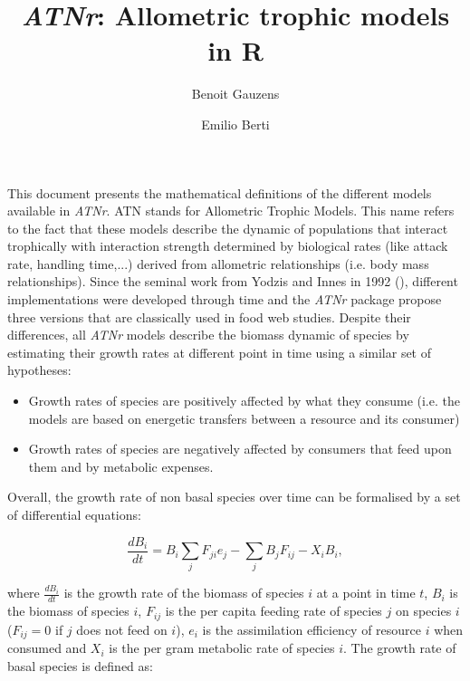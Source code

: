 \documentclass[12pt,a4paper]{article}
\title{\textit{ATNr}: Allometric trophic models in R}
\author[1,2]{Benoit Gauzens}
\author[1,2]{Emilio Berti}
\affil[1]{EcoNetLab, German Centre for Integrative Biodiversity Research (iDiv) Halle-Jena-Leipzig 04103 Germany}
\affil[2]{Institute of Biodiversity, Friedrich Schiller University Jena 07743 Germany}
\begin{document}
\maketitle

This document presents the mathematical definitions of the different models available in \textit{ATNr}. ATN stands for Allometric Trophic Models. 
This name refers to the fact that these models describe the dynamic of populations that interact trophically with interaction strength determined by biological rates (like attack rate, handling time,...) derived from allometric relationships (i.e. body mass relationships).
Since the seminal work from Yodzis and Innes in 1992 (\cite{Yodzis&Innes}), different implementations were developed through time and the \textit{ATNr} package propose three versions that are classically used in food web studies. Despite their differences, all \textit{ATNr} models describe the biomass dynamic of species by estimating their growth rates at different point in time using a similar set of hypotheses:
\begin{itemize}
\item Growth rates of species are positively affected by what they consume (i.e. the models are based on energetic transfers between a resource and its consumer)
\item Growth rates of species are negatively affected by consumers that feed upon them and by metabolic expenses. 
\end{itemize}
Overall, the growth rate of non basal species over time can be formalised by a set of differential equations:

\begin{equation}
\frac{dB_i}{dt} = B_i\sum_{j}F_{ji}e_{j} - \sum_{j}B_jF_{ij} - X_iB_i,
\end{equation}

where $\frac{dB_i}{dt}$ is the growth rate of the biomass of species $i$ at a point in time $t$, $B_i$ is the biomass of species $i$, $F_{ij}$ is the per capita feeding rate of species $j$ on species $i$ ($F_{ij}=0$ if $j$ does not feed on $i$), $e_{i}$ is the assimilation efficiency of resource $i$ when consumed and $X_i$ is the per gram metabolic rate of species $i$.  
The growth rate of basal species is defined as:
\end{document}
